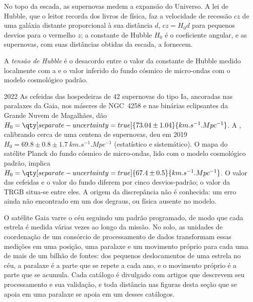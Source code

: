 No topo da escada, as supernovas medem a expansão do
Universo. A lei de Hubble, que o leitor recorda dos livros de física, faz a
velocidade de recessão $cz$ de uma galáxia distante proporcional à sua distância $d$,
$cz = H_0 d$ para pequenos desvios para o vermelho $z$; a constante de Hubble $H_0$ é o
coeficiente angular, e as supernovas, com suas distâncias obtidas da escada, a fornecem.

\begin{definition}\label{def:b3:milky-way-galaxies:tension}
A \emph{tensão de Hubble} é o desacordo entre o
valor da constante de Hubble medido localmente com a
 e o valor inferido do fundo cósmico de micro-ondas com o
modelo cosmológico padrão.
\end{definition}

\begin{dated}{2022}
As cefeidas das hospedeiras de 42 supernovas do tipo Ia, ancoradas nas
paralaxes da Gaia, nos máseres de NGC~4258 e nas binárias eclipsantes da
Grande Nuvem de Magalhães, dão
$H_0 = \qty[separate-uncertainty=true]{73.04 \pm 1.04}{km.s^{-1}.Mpc^{-1}}$.
A , calibrando cerca de uma centena de
supernovas, deu em 2019 $H_0 = 69.8 \pm 0.8 \pm \qty{1.7}{km.s^{-1}.Mpc^{-1}}$
(estatístico e sistemático). O mapa do satélite Planck do fundo cósmico de
micro-ondas, lido com o modelo cosmológico padrão, implica
$H_0 = \qty[separate-uncertainty=true]{67.4 \pm 0.5}{km.s^{-1}.Mpc^{-1}}$.
O valor das cefeidas e o valor do fundo diferem por cinco
desvios-padrão; o valor da TRGB situa-se entre eles. A origem da
discrepância não é conhecida: um erro ainda não encontrado em um dos degraus,
ou física ausente no modelo.
\end{dated}

\begin{inthelab}
O satélite Gaia varre o céu seguindo um padrão programado, de modo que cada
estrela é medida várias vezes ao longo da missão. No solo, as unidades de
coordenação de um consórcio de processamento de dados transformam essas
medições em uma posição, uma paralaxe e um movimento próprio para cada uma de
mais de um bilhão de fontes: dos pequenos deslocamentos de uma estrela no
céu, a paralaxe é a parte que se repete a cada ano, e o movimento próprio
é a parte que se acumula. Cada catálogo é divulgado com artigos que
descrevem seu processamento e sua validação, e toda distância nas figuras
desta seção que se apoia em uma paralaxe se apoia em um desses
catálogos.
\end{inthelab}

